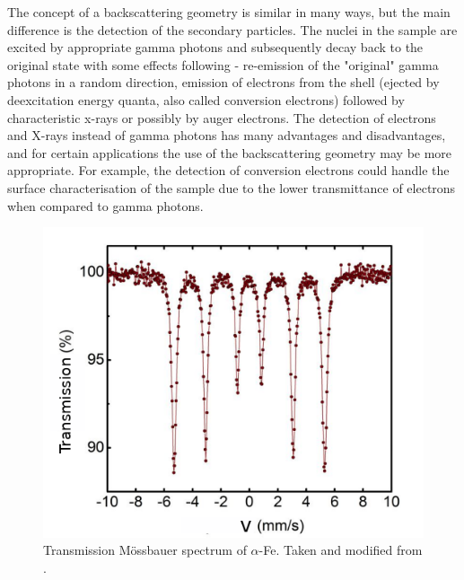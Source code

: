 \par
The concept of a backscattering geometry is similar in many ways, but the main difference is the detection of the secondary particles. The nuclei in the sample are excited by appropriate gamma photons and subsequently decay back to the original state with some effects following - re-emission of the "original" gamma photons in a random direction, emission of electrons from the shell (ejected by deexcitation energy quanta, also called conversion electrons) followed by characteristic x-rays or possibly by auger electrons. The detection of electrons and X-rays instead of gamma photons has many advantages and disadvantages, and for certain applications the use of the backscattering geometry may be more appropriate. For example, the detection of conversion electrons could handle the surface characterisation of the sample due to the lower transmittance of electrons when compared to gamma photons.

\begin{figure}[H]
 \centering
 \includegraphics[scale=0.7, angle = 0]{./pictures/MSSpec.png}
 \caption{Transmission Mössbauer spectrum of $\alpha$-Fe. Taken and modified from \cite{NOVAK2016thesis}.}
 \label{msspec}
 
\end{figure}


